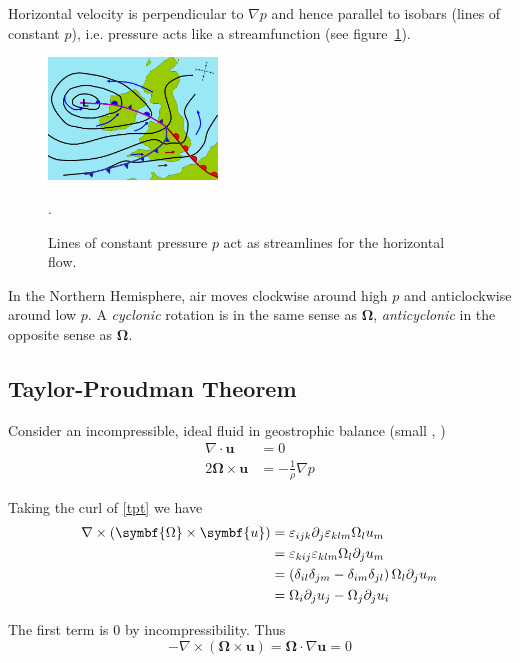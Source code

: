 \documentclass{jknotes}
\begin{document}
Horizontal velocity is perpendicular to $\nabla p$ and hence parallel to
isobars (lines of constant $p$), i.e. pressure acts like a streamfunction (see
figure~\ref{fig:isobars}).

\begin{figure}
	\centering
	\includegraphics[width=0.4\textwidth]{isobars.png}
	\caption{Lines of constant pressure $p$ act as streamlines for the
	horizontal flow.}
	\label{fig:isobars}.
\end{figure}

In the Northern Hemisphere, air moves clockwise around high $p$ and
anticlockwise around low $p$. A \emph{cyclonic} rotation is in the same sense
as $\symbf{\Omega}$, \emph{anticyclonic} in the opposite sense as $\symbf{\Omega}$.

\subsection{Taylor-Proudman Theorem}
Consider an incompressible, ideal fluid in geostrophic balance (small \Ro,
\Ek)
\begin{align}
	\nabla \cdot \symbf{u} &= 0\\
	2 \symbf{\Omega} \times \symbf{u} &= -\frac{1}{\rho}\nabla p \label{tpt}
\end{align}

Taking the curl of \eqref{tpt} we have
\begin{equation}
	\begin{aligned}
		\nabla \times \left( \symbf{\Omega} \times \symbf{u}\right) &= \vare_{ijk}
		\partial_j \vare_{klm} \Omega_l u_m \\
		&= \vare_{kij} \vare_{klm} \Omega_l \partial_j u_m \\
		&= \left(\delta_{il} \delta_{jm} - \delta_{im} \delta_{jl}\right)
		\Omega_l \partial_j u_m \\
		&= \Omega_i \partial_j u_j - \Omega_j \partial_j u_i
	\end{aligned}
\end{equation}

The first term is $0$ by incompressibility. Thus
\begin{equation}
	-\nabla \times \left(\symbf{\Omega} \times \symbf{u}\right) = \symbf{\Omega} \cdot
	\nabla \symbf{u} = 0
\end{equation}
\end{document}
